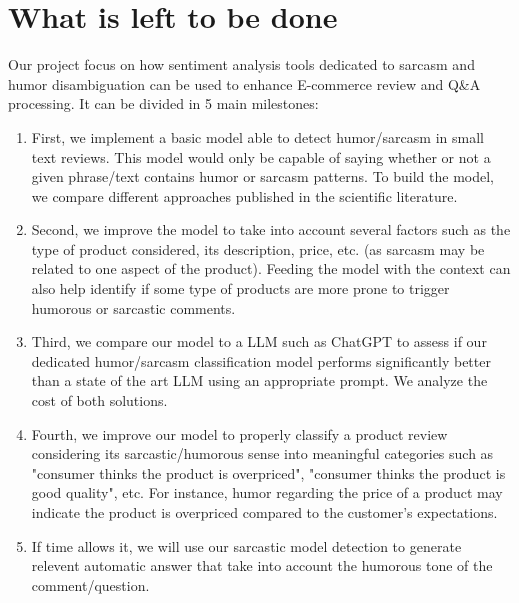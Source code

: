 \documentclass[10pt,twocolumn,letterpaper]{article}
\begin{document}

\section{What is left to be done}

Our project focus on how sentiment analysis tools dedicated to sarcasm and humor disambiguation can be used to enhance E-commerce review and Q\&A processing.
It can be divided in 5 main milestones:

\begin{enumerate}
    \item First, we implement a basic model able to detect humor/sarcasm in small text reviews. This model would only be capable of saying whether or not a given phrase/text contains humor or sarcasm patterns. To build the model, we compare different approaches published in the scientific literature.
    
    \item Second, we improve the model to take into account several factors such as the type of product considered, its description, price, etc. (as sarcasm may be related to one aspect of the product). Feeding the model with the context can also help identify if some type of products are more prone to trigger humorous or sarcastic comments.
    
    \item Third, we compare our model to a LLM such as ChatGPT to assess if our dedicated humor/sarcasm classification model performs significantly better than a state of the art LLM using an appropriate prompt. We analyze the cost of both solutions.
    
    \item Fourth, we improve our model to properly classify a product review considering its sarcastic/humorous sense into meaningful categories such as "consumer thinks the product is overpriced", "consumer thinks the product is good quality", etc. For instance, humor regarding the price of a product may indicate the product is overpriced compared to the customer’s expectations.
    
    \item If time allows it, we will use our sarcastic model detection to generate relevent automatic answer that take into account the humorous tone of the comment/question.
\end{enumerate}


\nocite{*}
{\small


}
\end{document}
